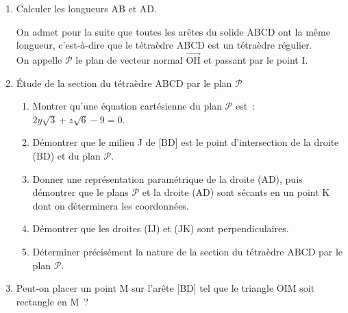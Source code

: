\begin{enumerate}
     \item Calculer les longueurs AB et AD.
     \par
\begin{margeneg}
On admet pour la suite que toutes les arêtes du solide ABCD ont la même longueur, c'est-à-dire que le tétraèdre ABCD est un tétraèdre régulier.\\
On appelle $\mathscr{P}$ le plan de vecteur normal $\overrightarrow{\text{OH}}$ et passant par le point I.
\end{margeneg}
     \par
     \item  Étude de la section du tétraèdre ABCD par le plan $\mathscr{P}$
     \begin{enumerate}[label=\alph*.]
          \item Montrer qu'une équation cartésienne du plan $\mathscr{P}$ est~: $2y\sqrt{3} + z\sqrt{6} - 9 = 0$.
          \item Démontrer que le milieu J de [BD] est le point d'intersection de la droite (BD) et du plan $\mathscr{P}$.
          \item  Donner une représentation paramétrique de la droite (AD), puis démontrer que le plans $\mathscr{P}$ et la droite (AD) sont sécants en un point K dont on déterminera les coordonnées.
          \item  Démontrer que les droites (IJ) et (JK) sont perpendiculaires.
          \item  Déterminer précisément la nature de la section du tétraèdre ABCD par le plan $\mathscr{P}$.
     \end{enumerate}
     \item  Peut-on placer un point M sur l'arête [BD] tel que le triangle OIM soit rectangle en M~?
\end{enumerate}

